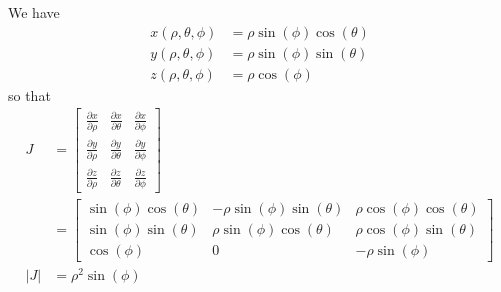 We have
\begin{align*}
  x(\rho, \theta, \phi) & = \rho \sin(\phi) \cos(\theta) \\
  y(\rho, \theta, \phi) & = \rho \sin(\phi) \sin(\theta) \\
  z(\rho, \theta, \phi) & = \rho \cos(\phi)
\end{align*}
so that
\begin{align*}
  J &= \begin{bmatrix} \frac{\partial x}{\partial \rho} & \frac{\partial x}{\partial \theta} & \frac{\partial x}{\partial \phi} \\ \frac{\partial y}{\partial \rho} & \frac{\partial y}{\partial \theta} & \frac{\partial y}{\partial \phi} \\ \frac{\partial z}{\partial \rho} & \frac{\partial z}{\partial \theta} & \frac{\partial z}{\partial \phi} \end{bmatrix} \\
    &= \begin{bmatrix} \sin(\phi) \cos(\theta) & -\rho \sin(\phi) \sin(\theta) & \rho \cos(\phi) \cos(\theta) \\ \sin(\phi) \sin(\theta) & \rho \sin(\phi) \cos(\theta) & \rho \cos(\phi) \sin(\theta) \\ \cos(\phi) & 0 & -\rho \sin(\phi) \end{bmatrix} \\
  |J| &= \rho^2 \sin(\phi)
\end{align*}
